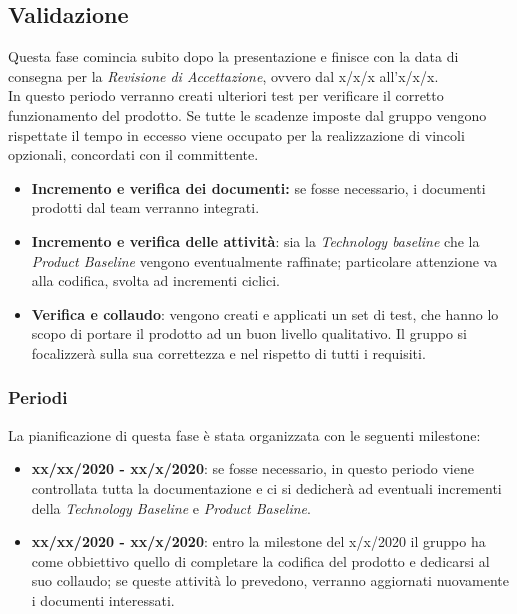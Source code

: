 \subsection{Validazione}
Questa fase comincia subito dopo la presentazione e finisce con la data di consegna per la \textit{Revisione di Accettazione}, ovvero dal x/x/x all'x/x/x.\\
In questo periodo verranno creati ulteriori test per verificare il corretto funzionamento del prodotto. Se tutte le scadenze imposte dal gruppo vengono rispettate il tempo in eccesso viene occupato per la realizzazione di vincoli opzionali, concordati con il committente. 

\begin{itemize}
\item \textbf{Incremento e verifica dei documenti:} se fosse necessario, i documenti prodotti dal team verranno integrati.

 \item \textbf{Incremento e verifica delle attività}: sia la \textit{Technology baseline} che la \textit{Product Baseline} vengono eventualmente raffinate; particolare attenzione va alla codifica, svolta ad incrementi ciclici.

 \item \textbf{Verifica e collaudo}: vengono creati e applicati un set di test, che hanno lo scopo di portare il prodotto ad un buon livello qualitativo. Il gruppo si focalizzerà sulla sua correttezza e nel rispetto di tutti i requisiti.
\end{itemize}

\subsubsection{Periodi}
La pianificazione di questa fase è stata organizzata con le seguenti milestone:

\begin{itemize}
\item \textbf{xx/xx/2020 - xx/x/2020}: se fosse necessario, in questo periodo viene controllata tutta la documentazione e ci si dedicherà ad eventuali incrementi della \textit{Technology Baseline} e \textit{Product Baseline}.

\item \textbf{xx/xx/2020 - xx/x/2020}: entro la milestone del x/x/2020 il gruppo ha come obbiettivo quello di completare la codifica del prodotto e dedicarsi al suo collaudo; se queste attività lo prevedono, verranno aggiornati nuovamente i documenti interessati.

\end{itemize}
